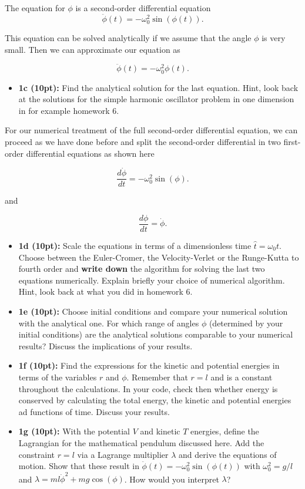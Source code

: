 \documentclass[%
oneside,                 %
final,                   %
10pt]{article}
\begin{document}
\noindent
The equation for $\phi$ is a second-order differential equation
\[
\ddot{\phi}(t)=-\omega_0^2\sin{(\phi(t))}.
\]

This equation can be solved analytically if we assume that the angle $\phi$ is very small. Then we can approximate our equation as

\[
\ddot{\phi}(t)=-\omega_0^2\phi(t).
\]

\begin{itemize}
\item \textbf{1c (10pt):} Find the analytical solution for the last equation. Hint, look back at the solutions for the simple harmonic oscillator problem in one dimension in for example homework 6.
\end{itemize}

\noindent
For our numerical treatment of the full second-order differential  equation, we can proceed as we have done before and split the second-order differential in two first-order differential equations
as shown here

\[
\frac{d\dot{\phi}}{dt}=-\omega_0^2\sin{(\phi)}.
\]

and

\[
\frac{d\phi}{dt}=\dot{\phi}.
\]


\begin{itemize}
\item \textbf{1d (10pt):} Scale the equations in terms of a dimensionless time $\hat{t}=\omega_0t$. Choose between the Euler-Cromer, the Velocity-Verlet or the Runge-Kutta to fourth order and \textbf{write down} the algorithm for solving the last two equations numerically. Explain briefly your choice of numerical algorithm. Hint, look back at what you did in homework 6.

\item \textbf{1e (10pt):} Choose initial conditions and compare your numerical solution with the analytical one. For which range of angles $\phi$ (determined by your initial conditions) are the analytical solutions comparable to your numerical results? Discuss the implications of your results.

\item \textbf{1f (10pt):} Find the expressions for the kinetic and potential energies in terms of the variables $r$ and $\phi$. Remember that $r=l$ and is a constant throughout the calculations. In your code, check then whether energy is conserved by calculating the total energy, the kinetic and potential energies ad functions of time. Discuss your results.

\item \textbf{1g (10pt):} With the potential $V$  and kinetic $T$ energies, define the Lagrangian for the mathematical pendulum discussed here. Add the constraint $r=l$ via a Lagrange multiplier $\lambda$ and derive the equations of motion. Show that these result in  $\ddot{\phi}(t)=-\omega_0^2\sin{(\phi(t))}$ with $\omega_0^2=g/l$ and $\lambda=ml\dot{\phi}^2+mg\cos{(\phi)}$.  How would you interpret $\lambda$? 
\end{itemize}
\end{document}
